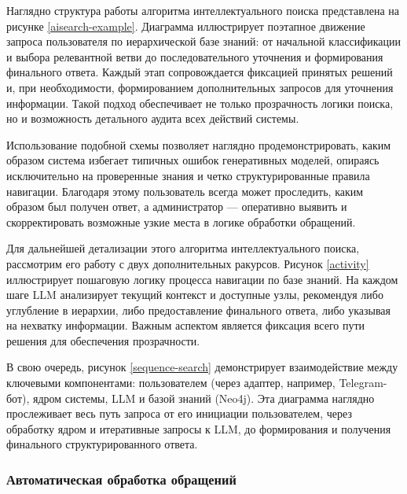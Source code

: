 Наглядно структура работы алгоритма интеллектуального поиска представлена на рисунке \ref{aisearch-example}. Диаграмма иллюстрирует поэтапное движение запроса пользователя по иерархической базе знаний: от начальной классификации и выбора релевантной ветви до последовательного уточнения и формирования финального ответа. Каждый этап сопровождается фиксацией принятых решений и, при необходимости, формированием дополнительных запросов для уточнения информации. Такой подход обеспечивает не только прозрачность логики поиска, но и возможность детального аудита всех действий системы.


Использование подобной схемы позволяет наглядно продемонстрировать, каким образом система избегает типичных ошибок генеративных моделей, опираясь исключительно на проверенные знания и четко структурированные правила навигации. Благодаря этому пользователь всегда может проследить, каким образом был получен ответ, а администратор — оперативно выявить и скорректировать возможные узкие места в логике обработки обращений.

Для дальнейшей детализации этого алгоритма интеллектуального поиска, рассмотрим его работу с двух дополнительных ракурсов. Рисунок \ref{activity} иллюстрирует пошаговую логику процесса навигации по базе знаний. На каждом шаге LLM анализирует текущий контекст и доступные узлы, рекомендуя либо углубление в иерархии, либо предоставление финального ответа, либо указывая на нехватку информации. Важным аспектом является фиксация всего пути решения для обеспечения прозрачности.



В свою очередь, рисунок \ref{sequence-search} демонстрирует взаимодействие между ключевыми компонентами: пользователем (через адаптер, например, Telegram-бот), ядром системы, LLM и базой знаний (Neo4j). Эта диаграмма наглядно прослеживает весь путь запроса от его инициации пользователем, через обработку ядром и итеративные запросы к LLM, до формирования и получения финального структурированного ответа.



\subsubsection{Автоматическая обработка обращений}

